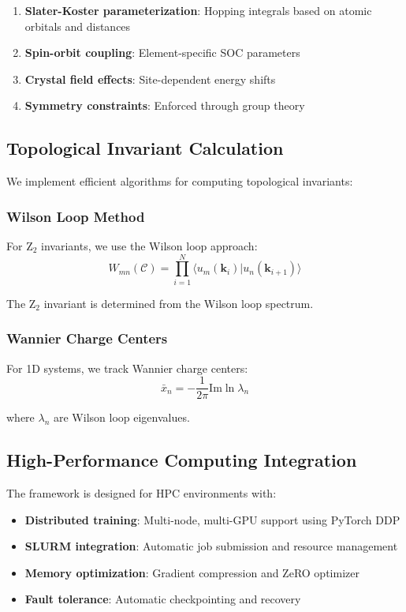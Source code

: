 \documentclass[12pt,a4paper]{article}
\begin{document}
\begin{enumerate}
\item \textbf{Slater-Koster parameterization}: Hopping integrals based on atomic orbitals and distances
\item \textbf{Spin-orbit coupling}: Element-specific SOC parameters
\item \textbf{Crystal field effects}: Site-dependent energy shifts
\item \textbf{Symmetry constraints}: Enforced through group theory
\end{enumerate}

\subsection{Topological Invariant Calculation}

We implement efficient algorithms for computing topological invariants:

\subsubsection{Wilson Loop Method}

For Z$_2$ invariants, we use the Wilson loop approach:
\begin{equation}
W_{mn}(\mathcal{C}) = \prod_{i=1}^{N} \langle u_m(\mathbf{k}_i) | u_n(\mathbf{k}_{i+1}) \rangle
\end{equation}

The Z$_2$ invariant is determined from the Wilson loop spectrum.

\subsubsection{Wannier Charge Centers}

For 1D systems, we track Wannier charge centers:
\begin{equation}
\bar{x}_n = -\frac{1}{2\pi} \text{Im} \ln \lambda_n
\end{equation}

where $\lambda_n$ are Wilson loop eigenvalues.

\subsection{High-Performance Computing Integration}

The framework is designed for HPC environments with:

\begin{itemize}
\item \textbf{Distributed training}: Multi-node, multi-GPU support using PyTorch DDP
\item \textbf{SLURM integration}: Automatic job submission and resource management
\item \textbf{Memory optimization}: Gradient compression and ZeRO optimizer
\item \textbf{Fault tolerance}: Automatic checkpointing and recovery
\end{itemize}
\end{document}
